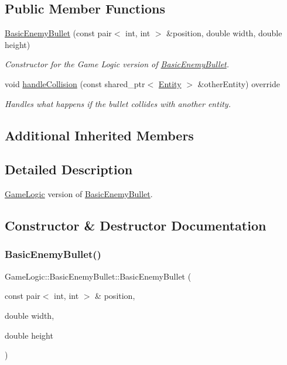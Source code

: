 \subsection*{Public Member Functions}
\begin{DoxyCompactItemize}
\item 
\hyperlink{classGameLogic_1_1BasicEnemyBullet_a7c6a8feb4edd34089738f1e9c54d31d2}{Basic\+Enemy\+Bullet} (const pair$<$ int, int $>$ \&position, double width, double height)
\begin{DoxyCompactList}\small\item\em Constructor for the Game Logic version of \hyperlink{classGameLogic_1_1BasicEnemyBullet}{Basic\+Enemy\+Bullet}. \end{DoxyCompactList}\item 
void \hyperlink{classGameLogic_1_1BasicEnemyBullet_a220f79a5cb5bfb33e63ad232457bad54}{handle\+Collision} (const shared\+\_\+ptr$<$ \hyperlink{classGameLogic_1_1Entity}{Entity} $>$ \&other\+Entity) override
\begin{DoxyCompactList}\small\item\em Handles what happens if the bullet collides with another entity. \end{DoxyCompactList}\end{DoxyCompactItemize}
\subsection*{Additional Inherited Members}


\subsection{Detailed Description}
\hyperlink{namespaceGameLogic}{Game\+Logic} version of \hyperlink{classGameLogic_1_1BasicEnemyBullet}{Basic\+Enemy\+Bullet}. 

\subsection{Constructor \& Destructor Documentation}
\mbox{\label{classGameLogic_1_1BasicEnemyBullet_a7c6a8feb4edd34089738f1e9c54d31d2}} 
\subsubsection{\texorpdfstring{Basic\+Enemy\+Bullet()}{BasicEnemyBullet()}}
{\footnotesize\ttfamily Game\+Logic\+::\+Basic\+Enemy\+Bullet\+::\+Basic\+Enemy\+Bullet (\begin{DoxyParamCaption}\item[{const pair$<$ int, int $>$ \&}]{position,  }\item[{double}]{width,  }\item[{double}]{height }\end{DoxyParamCaption})}

